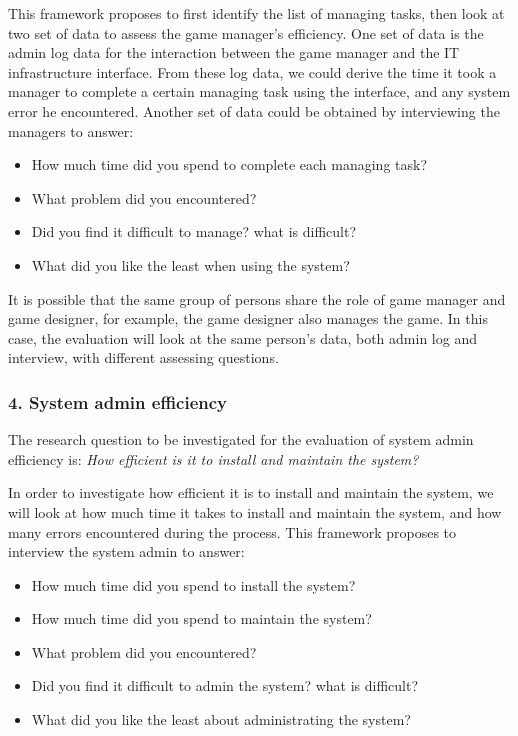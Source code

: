 \documentclass{sigchi}
\begin{document}
This framework proposes to first identify the list of managing tasks, then look at two set of data to assess the game manager's efficiency. One set of data is the admin log data for the interaction between the game manager and the IT infrastructure interface. From these log data, we could derive the time it took a manager to complete a certain managing task using the interface, and any system error he encountered. Another set of data could be obtained by interviewing the managers to answer:
\begin{itemize}
\item How much time did you spend to complete each managing task?
\item What problem did you encountered?
\item Did you find it difficult to manage? what is difficult?
\item What did you like the least when using the system?
\end{itemize}

It is possible that the same group of persons share the role of game manager and game designer, for example, the game designer also manages the game. In this case, the evaluation will look at the same person's data, both admin log and interview, with different assessing questions.

\subsubsection{4. System admin efficiency}
The research question to be investigated for the evaluation of system admin efficiency is: \emph{How efficient is it to install and maintain the system?}

In order to investigate how efficient it is to install and maintain the system, we will look at how much time it takes to install and maintain the system, and how many errors encountered during the process. This framework proposes to interview the system admin to answer:
\begin{itemize}
\item How much time did you spend to install the system?
\item How much time did you spend to maintain the system?
\item What problem did you encountered?
\item Did you find it difficult to admin the system? what is difficult?
\item What did you like the least about administrating the system?
\end{itemize}
\end{document}
